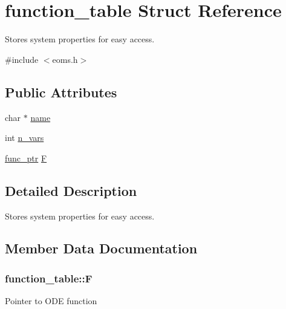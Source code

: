\hypertarget{structfunction__table}{}\section{function\+\_\+table Struct Reference}
\label{structfunction__table}


Stores system properties for easy access.  




{\ttfamily \#include $<$eoms.\+h$>$}

\subsection*{Public Attributes}
\begin{DoxyCompactItemize}
\item 
char $\ast$ \hyperlink{structfunction__table_a99650448c98f34476adf6caf60a22df2}{name}
\item 
int \hyperlink{structfunction__table_ae4e3f9023fbce759fc423e921e51d43f}{n\+\_\+vars}
\item 
\hyperlink{eoms_8h_ad41a7f3074b4b25351cbe9978efa090a}{func\+\_\+ptr} \hyperlink{structfunction__table_a9788c2e52edde5a8e37d1e7b4ea6b234}{F}
\end{DoxyCompactItemize}


\subsection{Detailed Description}
Stores system properties for easy access. 

\subsection{Member Data Documentation}
\hypertarget{structfunction__table_a9788c2e52edde5a8e37d1e7b4ea6b234}{}
\subsubsection[{F}]{ function\+\_\+table\+::\+F}\label{structfunction__table_a9788c2e52edde5a8e37d1e7b4ea6b234}
Pointer to O\+D\+E function \hypertarget{structfunction__table_ae4e3f9023fbce759fc423e921e51d43f}{}
